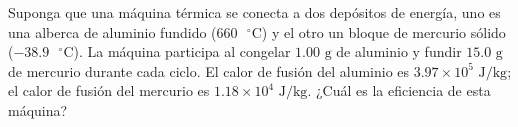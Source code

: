 \item Suponga que una máquina térmica se conecta a dos depósitos de energía, uno es una alberca de aluminio fundido ($660\text{ }^\circ\text{C}$) y el otro un bloque de mercurio sólido ($-38.9\text{ }^\circ\text{C}$). La máquina participa al congelar $1.00\text{ g}$ de aluminio y fundir $15.0\text{ g}$ de mercurio durante cada ciclo. El calor de fusión del aluminio es $3.97 \times 10^5\text{ J/kg}$; el calor de fusión del mercurio es $1.18 \times 10^4\text{ J/kg}$. ¿Cuál es la eficiencia de esta máquina?
